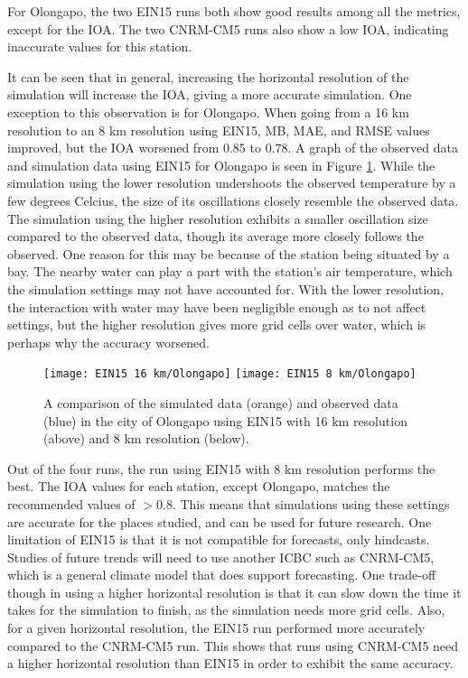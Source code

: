 	For Olongapo, the two EIN15 runs both show good results among all the metrics, except for the IOA.
	The two CNRM-CM5 runs also show a low IOA, indicating inaccurate values for this station.
	
	It can be seen that in general, increasing the horizontal resolution of the simulation will increase the IOA, giving a more accurate simulation.
	One exception to this observation is for Olongapo.
	When going from a 16 km resolution to an 8 km resolution using EIN15, MB, MAE, and RMSE values improved, but the IOA worsened from $0.85$ to $0.78$.
	A graph of the observed data and simulation data using EIN15 for Olongapo is seen in Figure \ref{fig:ein15-sim-vs-observed-olongapo}.
	While the simulation using the lower resolution undershoots the observed temperature by a few degrees Celcius, the size of its oscillations closely resemble the observed data.
	The simulation using the higher resolution exhibits a smaller oscillation size compared to the observed data, though its average more closely follows the observed.
	One reason for this may be because of the station being situated by a bay.
	The nearby water can play a part with the station’s air temperature, which the simulation settings may not have accounted for.
	With the lower resolution, the interaction with water may have been negligible enough as to not affect settings, but the higher resolution gives more grid cells over water, which is perhaps why the accuracy worsened.		
	
	\begin{figure}	
		\centering
		\texttt{[image: EIN15 16 km/Olongapo]}
		\texttt{[image: EIN15 8 km/Olongapo]}
		\caption{
			A comparison of the simulated data (orange) and observed data (blue) in the city of Olongapo using EIN15 with 16 km resolution (above) and 8 km resolution (below).
		}
		\label{fig:ein15-sim-vs-observed-olongapo}
	\end{figure}
	
	Out of the four runs, the run using EIN15 with 8 km resolution performs the best.
	The IOA values for each station, except Olongapo, matches the recommended values of $> 0.8$.
	This means that simulations using these settings are accurate for the places studied, and can be used for future research.
	One limitation of EIN15 is that it is not compatible for forecasts, only hindcasts. Studies of future trends will need to use another ICBC such as CNRM-CM5, which is  a general climate model that does support forecasting.
	One trade-off though in using a higher horizontal resolution is that it can slow down the time it takes for the simulation to finish, as the simulation needs more grid cells.
	Also, for a given horizontal resolution, the EIN15 run performed more accurately compared to the CNRM-CM5 run. 
	This shows that runs using CNRM-CM5 need a higher horizontal resolution than EIN15 in order to exhibit the same accuracy.

